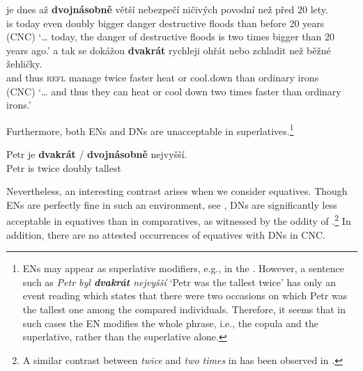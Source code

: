 \documentclass[output=paper,modfonts,hidelinks,newtxmath
\ChapterDOI{10.5281/zenodo.2545513}
]{langscibook}
\begin{document}
\ea\label{comparatives-cnc} \ea \gll {\ldots} je dnes až \textbf{dvojnásobně} větší nebezpečí ničivých
povodní než před 20 lety.\\
{} is today even doubly bigger danger destructive floods than before 20
years\\\hfill(CNC)
\glt `{\dots} today, the danger of destructive floods is two times bigger than 20
years ago.'
\ex \gll {\dots} a tak se dokážou \textbf{dvakrát} rychleji ohřát nebo zchladit než
běžné žehličky.\\
{} and thus \textsc{refl} manage twice faster heat or cool.down than ordinary
irons\\\hfill(CNC)
\glt `{\dots} and thus they can heat or cool down two times faster than ordinary
irons.'
\z
\z

\noindent Furthermore, both ENs and DNs are unacceptable in superlatives.\footnote{ENs may appear as superlative modifiers, e.g., in the . However, a sentence such as \textit{Petr byl \textbf{dvakrát} nejvyšší} `Petr was the tallest twice' has only an event reading which states that there were two occasions on which Petr was the tallest one among the compared individuals. Therefore, it seems that in such cases the EN modifies the whole phrase, i.e., the copula and the superlative, rather than the superlative alone.}

\ea *\gll Petr je \textbf{dvakrát} / \textbf{dvojnásobně} nejvyšší.\\
Petr is twice {} doubly tallest\\
\z

\noindent Nevertheless, an interesting contrast arises when we consider equatives. Though  ENs are perfectly fine in such an environment, see , DNs are significantly less acceptable in equatives than in comparatives, as witnessed by the oddity of .\footnote{A similar contrast between \textit{twice} and \textit{two times} in  has been observed in \cite{gobeski2011twice}.} In addition, there are no attested occurrences of equatives with DNs in CNC.

\ea\label{dvakrat-comp-eq} 
\z \z
\end{document}
